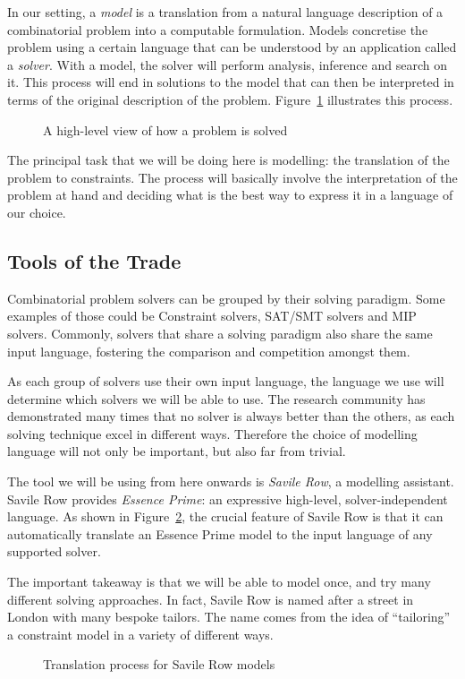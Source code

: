 In our setting, a \emph{model} is a translation from a natural language
description of a combinatorial problem into a computable formulation. Models
concretise the problem using a certain language that can be understood by an
application called a \emph{solver}. 
With a model, the solver will perform
analysis, inference and search on it. This process will end in solutions to the
model that can then be interpreted in terms of the original description of the
problem. Figure~\ref{fig-modelling} illustrates this process.

\begin{figure}
    \centering
    
    \label{fig-modelling}
    \caption{A high-level view of how a problem is solved}
\end{figure}

The principal task that we will be doing here is modelling: the translation of
the problem to constraints. The process will basically involve the
interpretation of the problem at hand and deciding what is the best way to
express it in a language of our choice.

\subsection{Tools of the Trade}

Combinatorial problem solvers can be grouped by their solving paradigm. Some
examples of those could be Constraint solvers, SAT/SMT solvers and MIP solvers.
Commonly, solvers that share a solving paradigm also share the same input
language, fostering the comparison and competition amongst them. 

As each group of solvers use their own input language, the language we use will
determine which solvers we will be able to use.
The research community has demonstrated many times that no solver is
always better than the others, as each solving technique excel in different
ways. Therefore the choice of modelling language will not only be important, but
also far from trivial.

The tool we will be using from here onwards is \emph{Savile Row}, a modelling
assistant. Savile Row provides \emph{Essence Prime}: an expressive high-level,
solver-independent language. As shown in Figure~\ref{fig-sr}, the crucial
feature of Savile Row is that it can automatically translate an Essence Prime
model to the input language of any supported solver. 

The important takeaway is that we will be able to model once, and try many
different solving approaches.  In fact, Savile Row is named after a street in
London with many bespoke tailors. The name comes from the idea of ``tailoring''
a constraint model in a variety of different ways.

\begin{figure}
    \centering
    
    \label{fig-sr}
    \caption{Translation process for Savile Row models}
\end{figure}

